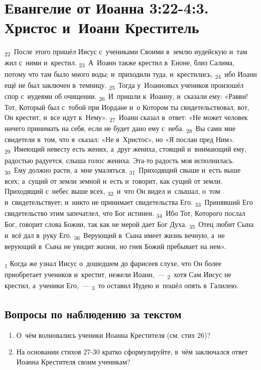 \documentclass[a4paper,12pt]{article}
\begin{document}

\section{Евангелие от Иоанна 3:22-4:3. Христос и~Иоанн Креститель}

\textsubscript{22}~После этого пришёл Иисус с~учениками Своими в~землю иудейскую и~там жил с~ними и~крестил. \textsubscript{23}~А~Иоанн также крестил в~Еноне, близ Салима, потому что там было много воды; и~приходили туда, и~крестились, \textsubscript{24}~ибо Иоанн ещё не был заключен в~темницу. \textsubscript{25}~Тогда у~Иоанновых учеников произошёл спор с~иудеями об очищении. \textsubscript{26}~И~пришли к~Иоанну, и~сказали ему: «Равви! Тот, Который был с~тобой при Иордане и~о Котором ты свидетельствовал, вот, Он крестит, и~все идут к~Нему». \textsubscript{27}~Иоанн сказал в~ответ: «Не может человек ничего принимать на себя, если не будет дано ему с~неба. \textsubscript{28}~Вы сами мне свидетели в~том, что я~сказал: «Не я~Христос», но «Я послан пред Ним». \textsubscript{29}~Имеющий невесту есть жених, а~друг жениха, стоящий и~внимающий ему, радостью радуется, слыша голос жениха. Эта-то радость моя исполнилась. \textsubscript{30}~Ему должно расти, а~мне умаляться. \textsubscript{31}~Приходящий свыше и~есть выше всех; а~сущий от земли земной и~есть и~говорит, как сущий от земли. Приходящий с~небес выше всех, \textsubscript{32}~и~что Он видел и~слышал, о~том и~свидетельствует; и~никто не принимает свидетельства Его. \textsubscript{33}~Принявший Его свидетельство этим запечатлел, что Бог истинен. \textsubscript{34}~Ибо Тот, Которого послал Бог, говорит слова Божии, так как не мерой дает Бог Духа. \textsubscript{35}~Отец любит Сына и~всё дал в~руку Его. \textsubscript{36}~Верующий в~Сына имеет жизнь вечную, а~не верующий в~Сына не увидит жизни, но гнев Божий пребывает на нем».

\textsubscript{1} Когда же узнал Иисус о~дошедшем до фарисеев слухе, что Он более приобретает учеников и~крестит, нежели Иоанн,~--- \textsubscript{2}~хотя Сам Иисус не крестил, а~ученики Его,~--- \textsubscript{3}~то оставил Иудею и~пошёл опять в~Галилею. 

\subsection*{Вопросы по наблюдению за текстом}
\begin{enumerate}
    \item О~чём волновались ученики Иоанна Крестителя (см. стих 26)? 
    
    \myline
    
    \myline
    \item На основании стихов 27-30 кратко сформулируйте, в~чём заключался ответ Иоанна Крестителя своим ученикам?
    
    \myline
    
    \myline
\end{enumerate}
\end{document}
